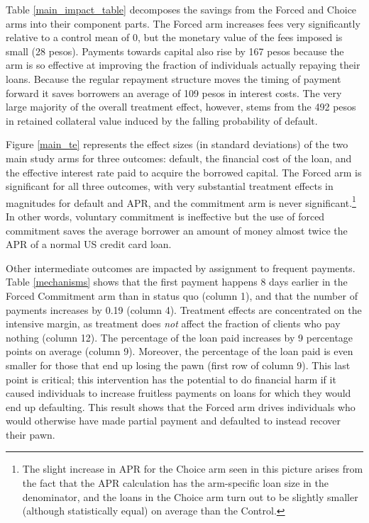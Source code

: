 \documentclass[oneside,11pt]{article}
\begin{document}
Table \ref{main_impact_table} decomposes the savings from the Forced and Choice arms into their component parts. The Forced arm increases fees very significantly relative to a control mean of 0, but the monetary value of the fees imposed is small (28 pesos).  Payments towards capital also rise by 167 pesos because the arm is so effective at improving the fraction of individuals actually repaying their loans.  Because the regular repayment structure moves the timing of payment forward it saves borrowers an average of 109 pesos in interest costs.  The very large majority of the overall treatment effect, however, stems from the 492 pesos in retained collateral value induced by the falling probability of default. 


Figure \ref{main_te} represents the  effect sizes (in standard deviations) of the two main study arms for three outcomes:  default, the financial cost of the loan, and the effective interest rate paid to acquire the borrowed capital.  The Forced arm is significant for all three outcomes, with very substantial treatment effects in magnitudes for default and APR, and the commitment arm is never significant.\footnote{The slight increase in APR for the Choice arm seen in this picture arises from the fact that the APR calculation has the arm-specific loan size in the denominator, and the loans in the Choice arm turn out to be slightly smaller (although statistically equal) on average than the Control.}    In other words, voluntary commitment is ineffective but the use of forced commitment saves the average borrower an amount of money almost twice the APR of a normal US credit card loan.  




Other intermediate outcomes are impacted by assignment to frequent payments. Table \ref{mechanisms} shows that the first payment happens 8 days earlier in the Forced Commitment arm than in status quo (column 1), and that the number of payments increases by 0.19 (column 4). Treatment effects are concentrated on the intensive margin, as treatment does \textit{not} affect the fraction of clients who pay nothing (column 12). The percentage of the loan paid increases by 9 percentage points on average (column 9). Moreover, the percentage of the loan paid is even smaller for those that end up losing the pawn (first row of column 9). This last point is critical; this intervention has the potential to do financial harm if it caused individuals to increase fruitless payments on loans for which they would end up defaulting.  This result shows that the Forced arm drives individuals who would otherwise have made partial payment and defaulted to instead recover their pawn.
\end{document}
